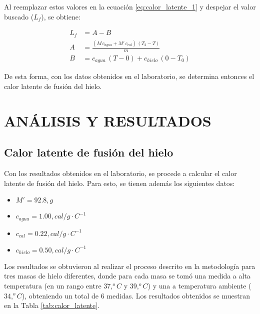 \documentclass[10pt]{article}
\begin{document}
\begin{multicols*}{2}
\begin{itemize}
              Al reemplazar estos valores en la ecuación \ref{eq:calor_latente_1} y despejar
              el valor buscado ($L_f$), se obtiene:

              \begin{equation}
                  \begin{split}
                      L_f &= A - B \\
                      A &= \frac{(M \, c_{agua} + M' \, c_{cal}) \, (T_2 - T)}{m} \\
                      B &= c_{agua} \, (T - 0) + c_{hielo} \, (0 - T_0)
                  \end{split}
                  \label{eq:calor_latente_3}
              \end{equation}

              De esta forma, con los datos obtenidos en el laboratorio, se determina entonces
              el calor latente de fusión del hielo.
    \end{itemize}

    \section{\small ANÁLISIS Y RESULTADOS}
    \subsection*{\small Calor latente de fusión del hielo}
    Con los resultados obtenidos en el laboratorio, se procede a calcular el calor
    latente de fusión del hielo. Para esto, se tienen además los siguientes datos:

    \begin{itemize}
        \item $M' = 92.8 , g$
        \item $c_{agua} = 1.00 , cal/g \cdot C^{-1}$
        \item $c_{cal} = 0.22 , cal/g \cdot C^{-1}$
        \item $c_{hielo} = 0.50 , cal/g \cdot C^{-1}$
    \end{itemize}

    Los resultados se obtuvieron al realizar el proceso descrito en la metodología
    para tres masas de hielo diferentes, donde para cada masa se tomó una medida a
    alta temperatura (en un rango entre $37 , ^oC$ y $39 , ^oC$) y una a
    temperatura ambiente ($34 , ^oC$), obteniendo un total de 6 medidas. Los
    resultados obtenidos se muestran en la Tabla \ref{tab:calor_latente}.


\end{multicols*}
\end{document}
